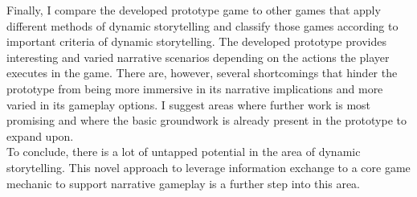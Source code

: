 Finally, I compare the developed prototype game to other games that apply different methods of dynamic storytelling and classify those games according to important criteria of dynamic storytelling. The developed prototype provides interesting and varied narrative scenarios depending on the actions the player executes in the game. There are, however, several shortcomings that hinder the prototype from being more immersive in its narrative implications and more varied in its gameplay options. I suggest areas where further work is most promising and where the basic groundwork is already present in the prototype to expand upon.\\
To conclude, there is a lot of untapped potential in the area of dynamic storytelling. This novel approach to leverage information exchange to a core game mechanic to support narrative gameplay is a further step into this area.
